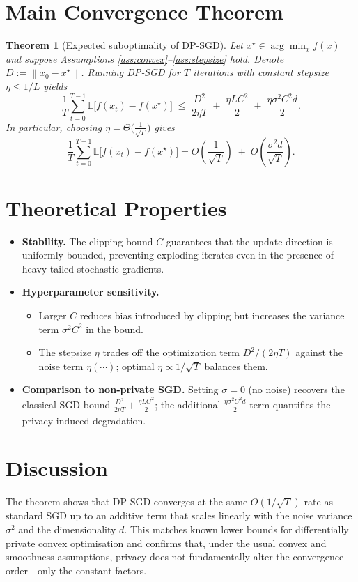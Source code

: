 \documentclass{article}
\newtheorem{theorem}{Theorem}
\newcommand{\E}{\mathbb{E}}
\newcommand{\norm}[1]{\left\lVert #1\right\rVert}
\begin{document}
\section*{Main Convergence Theorem}
\begin{theorem}[Expected suboptimality of DP‑SGD]\label{thm:main}
Let $x^{\star}\in\arg\min_{x}f(x)$ and suppose Assumptions \ref{ass:convex}–\ref{ass:stepsize} hold.
Denote $D:=\norm{x_{0}-x^{\star}}$.
Running DP‑SGD for $T$ iterations with constant stepsize $\eta\le 1/L$ yields
\[
\boxed{
\frac{1}{T}\sum_{t=0}^{T-1}\E\bigl[f(x_t)-f(x^{\star})\bigr]
\;\le\;
\frac{D^{2}}{2\eta T}
\;+\;
\frac{\eta L C^{2}}{2}
\;+\;
\frac{\eta\sigma^{2}C^{2}d}{2}.
}
\]
In particular, choosing $\eta=\Theta\!\bigl(\tfrac{1}{\sqrt{T}}\bigr)$ gives
\[
\frac{1}{T}\sum_{t=0}^{T-1}\E\bigl[f(x_t)-f(x^{\star})\bigr]=O\!\left(\frac{1}{\sqrt{T}}\right)
\;+\;O\!\left(\frac{\sigma^{2}d}{\sqrt{T}}\right).
\]
\end{theorem}

\section*{Theoretical Properties}
\begin{itemize}
\item \textbf{Stability.} The clipping bound $C$ guarantees that the update direction is uniformly bounded, preventing exploding iterates even in the presence of heavy‑tailed stochastic gradients.
\item \textbf{Hyperparameter sensitivity.}
    \begin{itemize}
        \item Larger $C$ reduces bias introduced by clipping but increases the variance term $\sigma^{2}C^{2}$ in the bound.
        \item The stepsize $\eta$ trades off the optimization term $D^{2}/(2\eta T)$ against the noise term $\eta(\cdots)$; optimal $\eta\propto 1/\sqrt{T}$ balances them.
    \end{itemize}
\item \textbf{Comparison to non‑private SGD.} Setting $\sigma=0$ (no noise) recovers the classical SGD bound
$\frac{D^{2}}{2\eta T}+ \frac{\eta L C^{2}}{2}$; the additional $\frac{\eta\sigma^{2}C^{2}d}{2}$ term quantifies the privacy‑induced degradation.
\end{itemize}

\section*{Discussion}
The theorem shows that DP‑SGD converges at the same $O(1/\sqrt{T})$ rate as standard SGD up to an additive term that scales linearly with the noise variance $\sigma^{2}$ and the dimensionality $d$. This matches known lower bounds for differentially private convex optimisation and confirms that, under the usual convex and smoothness assumptions, privacy does not fundamentally alter the convergence order—only the constant factors.
\end{document}
